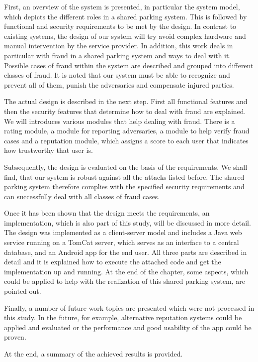 First, an overview of the system is presented, in particular the system model, which depicts the different roles in a shared parking system. This is followed by functional and security requirements to be met by the design. In contrast to existing systems, the design of our system will try avoid complex hardware and manual intervention by the service provider. In addition, this work deals in particular with fraud in a shared parking system and ways to deal with it. Possible cases of fraud within the system are described and grouped into different classes of fraud. It is noted that our system must be able to recognize and prevent all of them, punish the adversaries and compensate injured parties.

The actual design is described in the next step. First all functional features and then the security features that determine how to deal with fraud are explained. We will introduces various modules that help dealing with fraud. There is a rating module, a module for reporting adversaries, a module to help verify fraud cases and a reputation module, which assigns a score to each user that indicates how trustworthy that user is.

Subsequently, the design is evaluated on the basis of the requirements. We shall find, that our system is robust against all the attacks listed before. The shared parking system therefore complies with the specified security requirements and can successfully deal with all classes of fraud cases.

Once it has been shown that the design meets the requirements, an implementation, which is also part of this study, will be discussed in more detail. The design was implemented as a client-server model and includes a Java web service running on a TomCat server, which serves as an interface to a central database, and an Android app for the end user. All three parts are described in detail and it is explained how to execute the attached code and get the implementation up and running. At the end of the chapter, some aspects, which could be applied to help with the realization of this shared parking system, are pointed out.

Finally, a number of future work topics are presented which were not processed in this study. In the future, for example, alternative reputation systems could be applied and evaluated or the performance and good usability of the app could be proven.

At the end, a summary of the achieved results is provided.